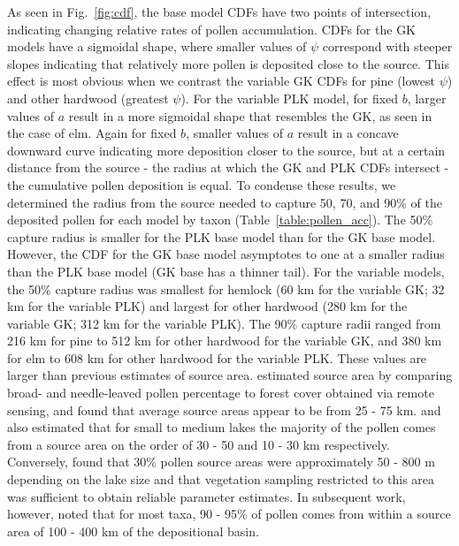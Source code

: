 \documentclass[12pt]{article}
\begin{document}
As seen in Fig.~\ref{fig:cdf}, the base model CDFs have two points
of intersection, indicating changing relative rates of pollen
accumulation. CDFs for the GK models have a sigmoidal shape, where
smaller values of $\psi$ correspond with steeper slopes indicating
that relatively more pollen is deposited close to the source. This
effect is most obvious when we contrast the variable GK CDFs for pine
(lowest $\psi$) and other hardwood (greatest $\psi$). For the variable
PLK model, for fixed $b$, larger values of $a$ result in a more
sigmoidal shape that resembles the GK, as seen in the case of
elm. Again for fixed $b$, smaller values of $a$ result in a concave
downward curve indicating more deposition closer to the source, but at
a certain distance from the source - the radius at which the GK and
PLK CDFs intersect - the cumulative pollen deposition is equal. To
condense these results, we determined the radius from the source
needed to capture 50, 70, and 90\% of the deposited pollen for each
model by taxon (Table~\ref{table:pollen_acc}). The 50\% capture radius
is smaller for the PLK base model than for the GK base model. However,
the CDF for the GK base model asymptotes to one at a smaller radius
than the PLK base model (GK base has a thinner tail). For the variable
models, the 50\% capture radius was smallest for hemlock (60 km for
the variable GK; 32 km for the variable PLK) and largest for other
hardwood (280 km for the variable GK; 312 km for the variable
PLK). The 90\% capture radii ranged from 216 km for pine to 512 km for
other hardwood for the variable GK, and 380 km for elm to 608 km for
other hardwood for the variable PLK. These values are larger than
previous estimates of source area. \citet{williams2003palynological}
estimated source area by comparing broad- and needle-leaved pollen
percentage to forest cover obtained via remote sensing, and found that
average source areas appear to be from 25 - 75
km. \citet{prentice1987quantitative} and
\citet{bradshaw1985relationships} also estimated that for small to
medium lakes the majority of the pollen comes from a source area on
the order of 30 - 50 and 10 - 30 km respectively. Conversely,
\citet{sugita1994pollen} found that 30\% pollen source areas were
approximately 50 - 800 m depending on the lake size and that
vegetation sampling restricted to this area was sufficient to obtain
reliable parameter estimates. In subsequent work, however,
\citet{sugita2007theory2} noted that for most taxa, 90 - 95\% of
pollen comes from within a source area of 100 - 400 km of the
depositional basin.
\end{document}
